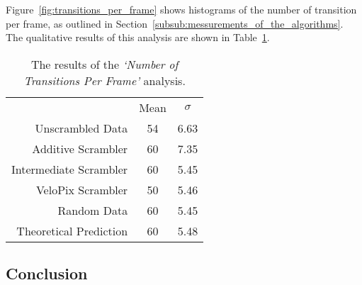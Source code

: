			Figure~\ref{fig:transitions_per_frame} shows histograms of the number of transition per frame, as outlined in Section~\ref{subsub:messurements_of_the_algorithms}. The qualitative results of this analysis are shown in Table~\ref{tab:transitions_per_frame}.
			\begin{table}[h]
				\centering
				\begin{tabular}{|r|cc|}
					\hline								 & Mean & $\sigma$ 	\\ \hhline{|=|==|}
					Unscrambled Data       & 54   & 6.63     	\\ \hhline{|=|==|}
					Additive Scrambler     & 60   & 7.35     	\\
					Intermediate Scrambler & 60   & 5.45     	\\
					VeloPix Scrambler      & 50   & 5.46     	\\ \hhline{|=|=:=|}
					Random Data            & 60   & 5.45     	\\
					Theoretical Prediction & 60   & 5.48    	\\ \hline
				\end{tabular}
				\caption{The results of the \textit{`Number of Transitions Per Frame'} analysis.}
				\label{tab:transitions_per_frame}
			\end{table}

	\subsection{Conclusion}








